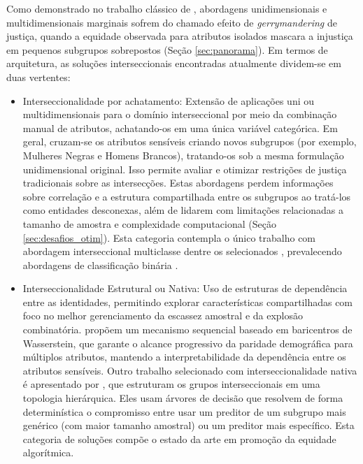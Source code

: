 Como demonstrado no trabalho clássico de \citet{kearns2018preventing}, abordagens unidimensionais e multidimensionais marginais sofrem do chamado efeito de \textit{gerrymandering} de justiça, quando a equidade observada para atributos isolados mascara a injustiça em pequenos subgrupos sobrepostos (Seção \ref{sec:panorama}). Em termos de arquitetura, as soluções interseccionais encontradas atualmente dividem-se em duas vertentes:
\begin{itemize}
    \item Interseccionalidade por achatamento: Extensão de aplicações uni ou multidimensionais para o domínio interseccional por meio da combinação manual de atributos, achatando-os em uma única variável categórica. Em geral, cruzam-se os atributos sensíveis criando novos subgrupos (por exemplo, Mulheres Negras e Homens Brancos), tratando-os sob a mesma formulação unidimensional original. Isso permite avaliar e otimizar restrições de justiça tradicionais sobre as intersecções. Estas abordagens perdem informações sobre correlação e a estrutura compartilhada entre os subgrupos ao tratá-los como entidades desconexas, além de lidarem com limitações relacionadas a tamanho de amostra e complexidade computacional (Seção \ref{sec:desafios_otim}). Esta categoria contempla o único trabalho com abordagem interseccional multiclasse dentre os selecionados \cite{martinez2020minimax}, prevalecendo abordagens de classificação binária \cite{wang2021fair,wang2022towards,gardner2023cross,lahoti2020fairness}.
    \item  Interseccionalidade Estrutural ou Nativa: Uso de estruturas de dependência entre as identidades, permitindo explorar características compartilhadas com foco no melhor gerenciamento da escassez amostral e da explosão combinatória. \citet{hu2024sequentially} propõem um mecanismo sequencial baseado em baricentros de Wasserstein, que garante o alcance progressivo da paridade demográfica para múltiplos atributos, mantendo a interpretabilidade da dependência entre os atributos sensíveis. Outro trabalho selecionado com interseccionalidade nativa é apresentado por \citet{deng2024multi}, que estruturam os grupos interseccionais em uma topologia hierárquica. Eles usam árvores de decisão que resolvem de forma determinística o compromisso entre usar um preditor de um subgrupo mais genérico (com maior tamanho amostral) ou um preditor mais específico. Esta categoria de soluções compõe o estado da arte em promoção da equidade algorítmica.
\end{itemize}

